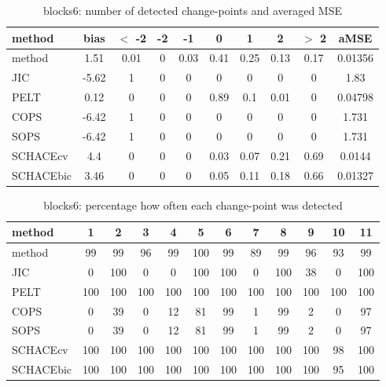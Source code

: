 \begin{table}[ht]
\centering
\begin{tabular}{l|c|ccccccc|c}
  \hline
method & bias & $<$ -2 & -2 & -1 & 0 & 1 & 2 & $>$ 2 & aMSE \\ 
  \hline
method &  1.51 &  0.01 &     0 &  0.03 &  0.41 &  0.25 &  0.13 &  0.17 & 0.01356 \\ 
  JIC & -5.62 &     1 &     0 &     0 &     0 &     0 &     0 &     0 &  1.83 \\ 
  PELT &  0.12 &     0 &     0 &     0 &  0.89 &   0.1 &  0.01 &     0 & 0.04798 \\ 
  COPS & -6.42 &     1 &     0 &     0 &     0 &     0 &     0 &     0 & 1.731 \\ 
  SOPS & -6.42 &     1 &     0 &     0 &     0 &     0 &     0 &     0 & 1.731 \\ 
  SCHACEcv &   4.4 &     0 &     0 &     0 &  0.03 &  0.07 &  0.21 &  0.69 & 0.0144 \\ 
  SCHACEbic &  3.46 &     0 &     0 &     0 &  0.05 &  0.11 &  0.18 &  0.66 & 0.01327 \\ 
   \hline
\end{tabular}
\caption{blocks6: number of detected change-points and averaged MSE} 
\label{tab:blocks6Njumps}
\end{table}
\begin{table}[ht]
\centering
\begin{tabular}{l|ccccccccccc}
  \hline
method & 1 & 2 & 3 & 4 & 5 & 6 & 7 & 8 & 9 & 10 & 11 \\ 
  \hline
method &     99 &     99 &     96 &     99 &    100 &     99 &     89 &     99 &     96 &     93 &     99 \\ 
  JIC &      0 &    100 &      0 &      0 &    100 &    100 &      0 &    100 &     38 &      0 &    100 \\ 
  PELT &    100 &    100 &    100 &    100 &    100 &    100 &    100 &    100 &    100 &    100 &    100 \\ 
  COPS &      0 &     39 &      0 &     12 &     81 &     99 &      1 &     99 &      2 &      0 &     97 \\ 
  SOPS &      0 &     39 &      0 &     12 &     81 &     99 &      1 &     99 &      2 &      0 &     97 \\ 
  SCHACEcv &    100 &    100 &    100 &    100 &    100 &    100 &    100 &    100 &    100 &     98 &    100 \\ 
  SCHACEbic &    100 &    100 &    100 &    100 &    100 &    100 &    100 &    100 &    100 &     95 &    100 \\ 
   \hline
\end{tabular}
\caption{blocks6: percentage how often each change-point was detected} 
\label{tab:blocks6Detections}
\end{table}
